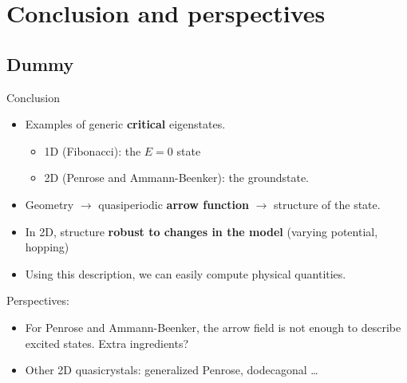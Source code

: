 \documentclass[xcolor=x11names,compress,professionalfonts, aspectratio=169]{beamer}
\renewcommand{\(}{\begin{columns}}
\renewcommand{\)}{\end{columns}}
\newcommand{\<}[1]{\begin{column}{#1}}
\renewcommand{\>}{\end{column}}
\begin{document}
\section{Conclusion and perspectives}
\subsection{Dummy}
\begin{frame}{Conclusion}
\begin{itemize}
	\item Examples of generic \textbf{critical} eigenstates.
	\begin{itemize}
		\item 1D (Fibonacci): the $E=0$ state
		\item 2D (Penrose and Ammann-Beenker): the groundstate.
	\end{itemize}
	\item Geometry $\rightarrow$ quasiperiodic \textbf{arrow function} $\rightarrow$ structure of the state.
	\item In 2D, structure \textbf{robust to changes in the model} (varying potential, hopping)
	\item Using this description, we can easily compute physical quantities.
\end{itemize}
Perspectives:
\begin{itemize}
	\item For Penrose and Ammann-Beenker, the arrow field is not enough to describe excited states. Extra ingredients?
	\item Other 2D quasicrystals: generalized Penrose, dodecagonal \dots
\end{itemize}
\end{frame}
\end{document}
